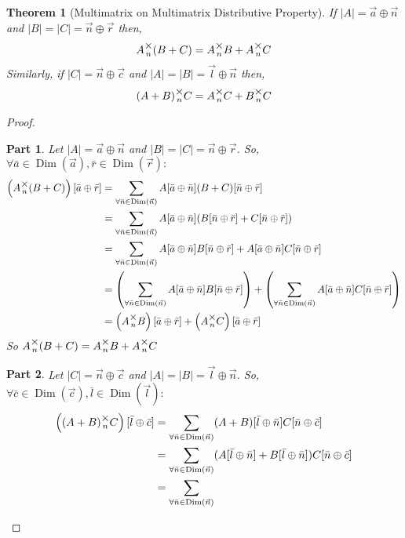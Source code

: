 \documentclass[12pt]{article}
\theoremstyle{definition}
\theoremstyle{plain}
\newtheorem{theorem}{Theorem}[section]
\theoremstyle{ppart}
\newtheorem{ppart}{Part}
\DeclareMathOperator{\Dim}{Dim}
\newcommand{\mmult}[1]{\text{\raisebox{1ex}{$\underset{#1}{\times}$}}}
\begin{document}
\begin{landscape}
\begin{theorem}[Multimatrix on Multimatrix Distributive Property]
If $|A| = \vec{a} \oplus \vec{n}$ and $|B|=|C|=\vec{n} \oplus \vec{r}$ then,
\[ A \mmult{n} (B + C) = A \mmult{n} B + A \mmult{n} C \]
Similarly, if $|C| = \vec{n} \oplus \vec{c}$ and $|A|=|B|=\vec{l} \oplus \vec{n}$ then,
\[ (A + B) \mmult{n} C = A \mmult{n} C + B \mmult{n} C \]
\end{theorem}
\begin{proof}
\begin{ppart}
Let $|A| = \vec{a} \oplus \vec{n}$ and $|B|=|C|=\vec{n} \oplus \vec{r}$.
So, $\forall \bar{a} \in \Dim(\vec{a}), \bar{r} \in \Dim(\vec{r}) :$
\begin{align*}
 \left( A \mmult{n} (B + C) \right)[\bar{a} \oplus \bar{r}]
 &= \sum_{\forall \bar{n} \in \Dim(\vec{n})}
    A[\bar{a} \oplus \bar{n}] (B + C)[\bar{n} \oplus \bar{r}] \\
 &= \sum_{\forall \bar{n} \in \Dim(\vec{n})}
    A[\bar{a} \oplus \bar{n}] (B[\bar{n} \oplus \bar{r}] + C[\bar{n} \oplus \bar{r}]) \\
 &= \sum_{\forall \bar{n} \in \Dim(\vec{n})}
    A[\bar{a} \oplus \bar{n}] B[\bar{n} \oplus \bar{r}]
  + A[\bar{a} \oplus \bar{n}]C[\bar{n} \oplus \bar{r}] \\
 &= \left( \sum_{\forall \bar{n} \in \Dim(\vec{n})}
    A[\bar{a} \oplus \bar{n}] B[\bar{n} \oplus \bar{r}] \right)
    +
    \left( \sum_{\forall \bar{n} \in \Dim(\vec{n})}
    A[\bar{a} \oplus \bar{n}]C[\bar{n} \oplus \bar{r}] \right) \\
 &= \left( A \mmult{n} B \right)[\bar{a} \oplus \bar{r}] +
     \left( A \mmult{n} C \right)[\bar{a} \oplus \bar{r}]
\end{align*}
So $A \mmult{n} (B + C) = A \mmult{n} B + A \mmult{n} C$
\end{ppart}
\begin{ppart}
Let $|C| = \vec{n} \oplus \vec{c}$ and $|A|=|B|=\vec{l} \oplus \vec{n}$.
So, $\forall \bar{c} \in \Dim(\vec{c}), \bar{l} \in \Dim(\vec{l}) :$
\begin{align*}
 \left( (A + B) \mmult{n} C \right)[\bar{l} \oplus \bar{c}]
 &= \sum_{\forall \bar{n} \in \Dim(\vec{n})}
    (A+B)[\bar{l} \oplus \bar{n}] C[\bar{n} \oplus \bar{c}] \\
 &= \sum_{\forall \bar{n} \in \Dim(\vec{n})}
    (A[\bar{l} \oplus \bar{n}]+B[\bar{l} \oplus \bar{n}])C[\bar{n} \oplus \bar{c}] \\
 &= \sum_{\forall \bar{n} \in \Dim(\vec{n})}

\end{align*}
\end{ppart}
\end{proof}
\end{landscape}
\end{document}
